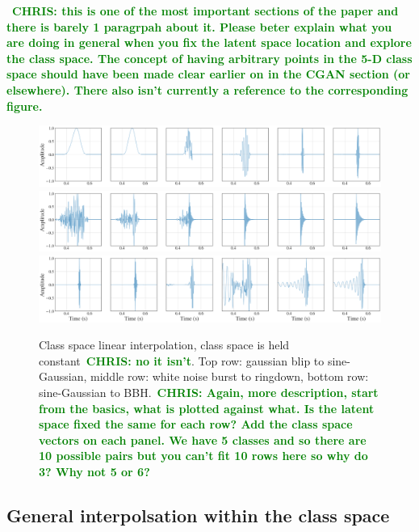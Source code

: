 \documentclass[12pt]{iopart}
\newcommand{\chris}[1]{\textbf{\textcolor{green}{CHRIS: #1}}}
\begin{document}
~\chris{this is one of  the most important sections of the paper and there
is barely 1 paragrpah about it. Please beter explain what you are doing in
general when you fix the latent space location and explore the class space. The
concept of having arbitrary points in the 5-D class space should have been made
clear earlier on in the CGAN section (or elsewhere). There also isn't currently a
reference to the corresponding figure.}

\begin{figure}
    \centering
    \includegraphics[width=\textwidth]{figures/generations/interp_blip-sg.png}
    \includegraphics[width=\textwidth]{figures/generations/interp_wnb-rd.png}
    \includegraphics[width=\textwidth]{figures/generations/interp_sg-bbh.png}
    \caption{Class space linear interpolation, class space is held
constant~\chris{no it isn't}.
Top row: gaussian blip to sine-Gaussian, middle row: white noise burst to
ringdown, bottom row: sine-Gaussian to BBH.~\chris{Again, more description,
start from the basics, what is plotted against what. Is the latent space fixed
the same for each row? Add the class space vectors on each panel. We have 5
classes and so there are 10 possible pairs but you can't fit 10 rows here so
why do 3? Why not 5 or 6? }}
    \label{fig:c_interp}
\end{figure}

\subsection{General interpolsation within the class space}
\end{document}
